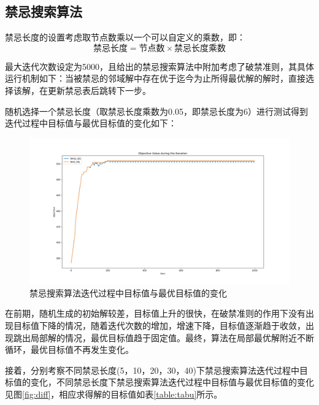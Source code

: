 \documentclass{article}
\begin{document}
    \subsection{禁忌搜索算法}
    禁忌长度的设置考虑取节点数乘以一个可以自定义的乘数，即：
    \begin{equation}
        \mbox{禁忌长度} = \mbox{节点数} \times \mbox{禁忌长度乘数}
    \end{equation}

    最大迭代次数设定为5000，且给出的禁忌搜索算法中附加考虑了破禁准则，其具体运行机制如下：当被禁忌的邻域解中存在优于迄今为止所得最优解的解时，直接选择该解，在更新禁忌表后跳转下一步。

    随机选择一个禁忌长度（取禁忌长度乘数为0.05，即禁忌长度为6）进行测试得到迭代过程中目标值与最优目标值的变化如下：
    \begin{figure}[H]
        \centering
        \includegraphics[width=\textwidth]{./image/tabu6.png}
        \caption{禁忌搜索算法迭代过程中目标值与最优目标值的变化}
    \end{figure}

    在前期，随机生成的初始解较差，目标值上升的很快，在破禁准则的作用下没有出现目标值下降的情况，随着迭代次数的增加，增速下降，目标值逐渐趋于收敛，出现跳出局部解的情况，最优目标值趋于固定值。最终，算法在局部最优解附近不断循环，最优目标值不再发生变化。

    接着，分别考察不同禁忌长度(5，10，20，30，40)下禁忌搜索算法迭代过程中目标值的变化，不同禁忌长度下禁忌搜索算法迭代过程中目标值与最优目标值的变化见图\ref{fig:diff}，相应求得解的目标值如表\ref{table:tabu}所示。
\end{document}

